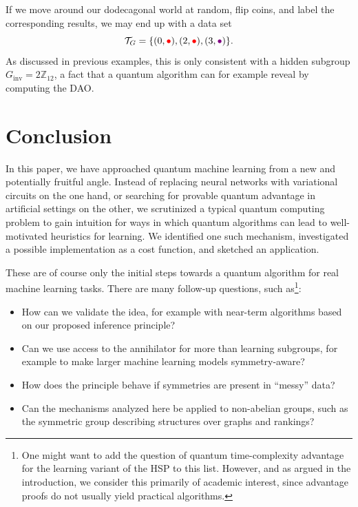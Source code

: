 \documentclass[aps, pre,reprint,nofootinbib,citeautoscript,floatfix]{revtex4-1}
\begin{document}
\begin{example}
  If we move around our dodecagonal world at random, flip coins, and label the corresponding results, we may end up with a data set
  \[
  \mathcal{T}_G = \{(0, \textcolor{red}{\bullet}), (2, \textcolor{red}{\bullet}), (3, \textcolor{violet}{\bullet})\}.
  \]
  As discussed in previous examples, this is only consistent with a hidden subgroup $G_\text{inv} = 2\mathbb{Z}_{12}$, a fact that a quantum algorithm can for example reveal by computing the DAO.
\end{example}

\section{Conclusion}
\label{sec:conclusion}

In this paper, we have approached quantum machine learning from a new and potentially fruitful angle. Instead of replacing neural networks with variational circuits on the one hand, or searching for provable quantum advantage in artificial settings on the other, we scrutinized a typical quantum computing problem to gain intuition for ways in which quantum algorithms can lead to well-motivated heuristics for learning. We identified one such mechanism, investigated a possible implementation as a cost function, and sketched an application.

These are of course only the initial steps towards a quantum algorithm for real machine learning tasks. There are many follow-up questions, such as\footnote{One might want to add the question of quantum time-complexity advantage for the learning variant of the HSP to this list. However, and as argued in the introduction, we consider this primarily of academic interest, since advantage proofs do not usually yield practical algorithms.}: 
\begin{itemize}
    \item How can we validate the idea, for example with near-term algorithms based on our proposed inference principle? 
    \item Can we use access to the annihilator for more than learning subgroups, for example to make larger machine learning models symmetry-aware?
    \item How does the principle behave if symmetries are present in ``messy'' data?
    \item Can the mechanisms analyzed here be applied to non-abelian groups, such as the symmetric group describing structures over graphs and rankings?
\end{itemize}
\end{document}
